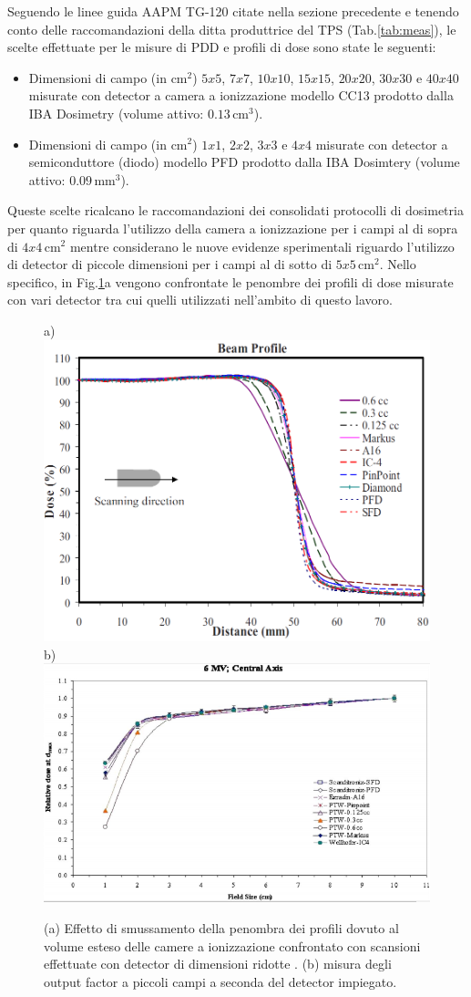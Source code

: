 Seguendo le linee guida AAPM TG-120 citate nella sezione precedente \cite{Low2011} e tenendo conto delle raccomandazioni della ditta produttrice del TPS (Tab.\ref{tab:meas}), le scelte effettuate per le misure di PDD e profili di dose sono state le seguenti:
\begin{itemize}
\item Dimensioni di campo (in cm$^2$) $5x5$, $7x7$, $10x10$, $15x15$, $20x20$, $30x30$ e $40x40$ misurate con detector a camera a ionizzazione modello CC13 prodotto dalla IBA Dosimetry (volume attivo: $0.13\,$cm$^3$).
\item Dimensioni di campo (in cm$^2$) $1x1$, $2x2$, $3x3$ e $4x4$ misurate con detector a semiconduttore (diodo) modello PFD prodotto dalla IBA Dosimtery (volume attivo: $0.09\,$mm$^3$).
\end{itemize}
Queste scelte ricalcano le raccomandazioni dei consolidati protocolli di dosimetria per quanto riguarda l'utilizzo della camera a ionizzazione per i campi al di sopra di $4x4\,$cm$^2$ mentre considerano le nuove evidenze sperimentali \cite{Das2008a,Low2011} riguardo l'utilizzo di detector di piccole dimensioni per i campi al di sotto di $5x5\,$cm$^2$. Nello specifico, in Fig.\ref{fig:pen_of}a vengono confrontate le penombre dei profili di dose misurate con vari detector tra cui quelli utilizzati nell'ambito di questo lavoro.
\begin{figure}[!t]
\centering
a)\includegraphics[width=.75\textwidth]{./cap2/pen_smear.png}\\
b)\includegraphics[width=.75\textwidth]{./cap2/OF_uncert.png}
\caption{(a) Effetto di smussamento della penombra dei profili dovuto al volume esteso delle camere a ionizzazione confrontato con scansioni effettuate con detector di dimensioni ridotte \cite{Das2008a}. (b) misura degli output factor a piccoli campi a seconda del detector impiegato\cite{Das2008}.}
\label{fig:pen_of}
\end{figure}
